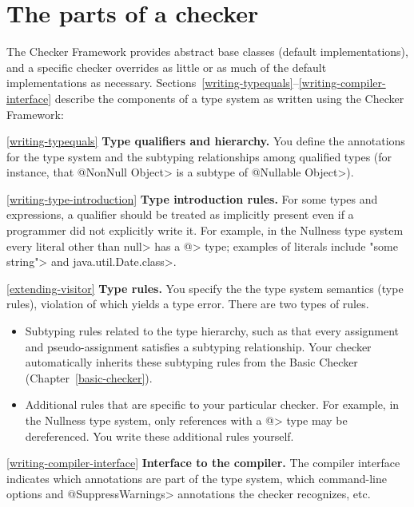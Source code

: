 \section{The parts of a checker\label{parts-of-a-checker}}

The Checker Framework provides abstract base classes (default
implementations), and a specific checker overrides as little or as much of
the default implementations as necessary.
%
Sections~\ref{writing-typequals}--\ref{writing-compiler-interface} describe
the components of a type system as written using the Checker Framework:

\begin{description}

\item{\ref{writing-typequals}}
  \textbf{Type qualifiers and hierarchy.}  You define the annotations for
  the type system and the subtyping relationships among qualified types
  (for instance, that \<@NonNull Object> is a subtype of \<@Nullable
  Object>).

\item{\ref{writing-type-introduction}}
  \textbf{Type introduction rules.}  For some types and
  expressions, a qualifier should be treated as implicitly present even if a
  programmer did not explicitly write it.  For example, in the Nullness
  type system every literal
  other than \<null> has a \<@> type;
  examples of literals include \<"some string"> and \<java.util.Date.class>.

\item{\ref{extending-visitor}}
  \textbf{Type rules.}  You specify the the type system semantics (type
  rules), violation of which yields a type error.  There are two types of
  rules.
\begin{itemize}
\item
  Subtyping rules related to the type hierarchy, such as that every
  assignment and pseudo-assignment satisfies a subtyping relationship.
  Your checker automatically inherits these subtyping rules from the Basic
  Checker (Chapter~\ref{basic-checker}).
\item
  Additional rules that are specific to your particular checker.  For
  example, in the Nullness type system, only references with a
  \<@> type may be dereferenced.  You
  write these additional rules yourself.
\end{itemize}

\item{\ref{writing-compiler-interface}}
  \textbf{Interface to the compiler.}  The compiler interface indicates
  which annotations are part of the type system, which command-line options
  and \<@SuppressWarnings> annotations the checker recognizes, etc.
\end{description}


